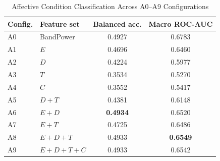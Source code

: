 \begin{table}[!t]
\caption{Affective Condition Classification Across A0--A9 Configurations}
\label{tab:affective_ablation}
\centering
\footnotesize
\begin{tabular}{llcc}
\hline
Config. & Feature set & Balanced acc. & Macro ROC-AUC \\
\hline
A0 & BandPower & 0.4927 & 0.6783 \\
A1 & $E$ & 0.4696 & 0.6460 \\
A2 & $D$ & 0.4224 & 0.5977 \\
A3 & $T$ & 0.3534 & 0.5270 \\
A4 & $C$ & 0.3552 & 0.5417 \\
A5 & $D+T$ & 0.4381 & 0.6148 \\
A6 & $E+D$ & \textbf{0.4934} & 0.6520 \\
A7 & $E+T$ & 0.4725 & 0.6486 \\
A8 & $E+D+T$ & 0.4933 & \textbf{0.6549} \\
A9 & $E+D+T+C$ & 0.4933 & 0.6542 \\
\hline
\end{tabular}
\end{table}
